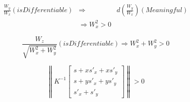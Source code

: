 \begin{equation}
	\begin{aligned}
		\frac{W_y}{W_x} (is Differentiable) & \Rightarrow           & d(\frac{W_y}{W_x})(Meaningful) \\
		                                    & \Rightarrow W_x^2 > 0
	\end{aligned}
\end{equation}

\begin{equation}
	\frac{W_z}{\sqrt{W_x^2+W_y^2}} (is Differentiable) \Rightarrow W_x^2 + W_y^2 > 0
\end{equation}

\begin{equation}
	\left\|
	K^{-1}
	\begin{bmatrix}
		s + x s'_x + x s'_y \\
		s + y s'_x + y s'_y \\
		s'_x + s'_y
	\end{bmatrix}
	\right\|
	> 0
\end{equation}



